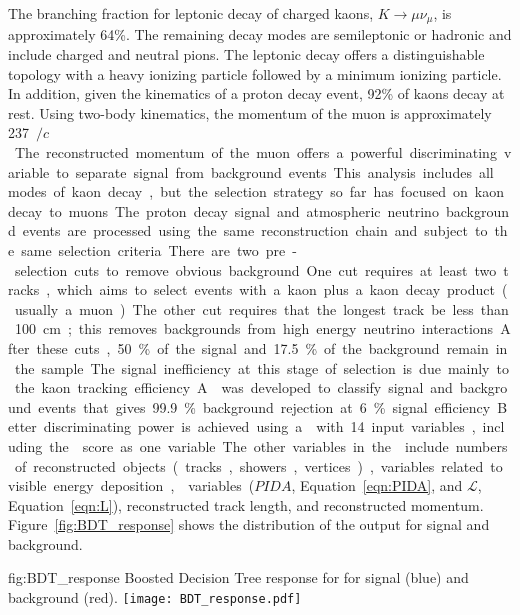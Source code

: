 The branching fraction for leptonic decay of charged kaons, $K\rightarrow \mu \nu_{\mu}$, is approximately \num{64}\%. The remaining decay modes are semileptonic or hadronic and include charged and neutral pions. The leptonic decay offers a distinguishable topology with a heavy ionizing particle followed by a minimum ionizing particle. In addition, given the kinematics of a proton decay event, \num{92}\% of kaons decay at rest. Using two-body kinematics, the momentum of the muon is approximately \SI{237}{\MeV$/c$}. The reconstructed momentum of the muon offers a powerful discriminating variable to separate signal from background events.  This analysis includes all modes of kaon decay, but the selection strategy so far has focused on kaon decay to muons.

The proton decay signal and atmospheric neutrino background events are processed using the same reconstruction chain and subject to the same selection criteria. There are two pre-selection cuts to remove obvious background. One cut requires at least two tracks, which aims to select events with a kaon plus a kaon decay product (usually a muon).  The other cut requires that the longest track be less than \SI{100}{\cm}; this removes backgrounds from high energy neutrino interactions.  After these cuts, \num{50}\% of the signal and \num{17.5}\% of the background remain in the sample.  The signal inefficiency at this stage of selection is due mainly to the kaon tracking efficiency.

A  was developed to classify signal and background events that gives \num{99.9}\% background rejection at \num{6}\% signal efficiency.  Better discriminating power is achieved using a  with \num{14} input variables, including the  score as one  variable.  The other variables in the  include numbers of reconstructed objects (tracks, showers, vertices), variables related to visible energy deposition,  variables ($PIDA$, Equation~\ref{eqn:PIDA}, and $\mathcal{L}$, Equation~\ref{eqn:L}), reconstructed track length, and reconstructed momentum.
Figure~\ref{fig:BDT_response} shows the distribution of the  output for signal and background.

\begin{dunefigure}
{fig:BDT_response}
{Boosted Decision Tree response for \ptoknubar for signal (blue) and background (red).}
\texttt{[image: BDT\_response.pdf]}
\end{dunefigure} 


